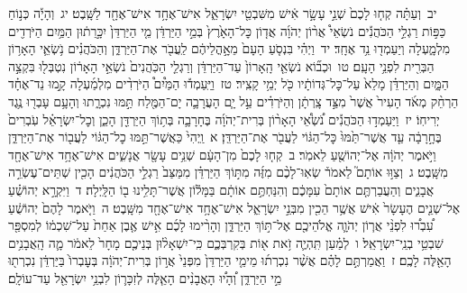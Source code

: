 \documentclass[18pt]{article}
\newcommand{\kri}[1]{\Afootnote{#1}}	%
\begin{document}
 {\loc יב~}וְעַתָּ֗ה קְח֤וּ לָכֶם֙ שְׁנֵ֣י עָשָׂ֣ר אִ֔ישׁ מִשִּׁבְטֵ֖י יִשְׂרָאֵ֑ל אִישׁ־אֶחָ֥ד אִישׁ־אֶחָ֖ד לַשָּֽׁבֶט׃ \startlock
 {\loc יג~}וְהָיָ֡ה כְּנ֣וֹחַ כַּפּ֣וֹת רַגְלֵ֣י הַכֹּהֲנִ֡ים נֹשְׂאֵי֩ אֲר֨וֹן יְהֹוָ֜ה אֲד֤וֹן כׇּל־הָאָ֙רֶץ֙ בְּמֵ֣י הַיַּרְדֵּ֔ן מֵ֤י הַיַּרְדֵּן֙ יִכָּ֣רֵת֔וּן הַמַּ֥יִם הַיֹּרְדִ֖ים מִלְמָ֑עְלָה וְיַעַמְד֖וּ נֵ֥ד אֶחָֽד׃ \startlock
 {\loc יד~}וַיְהִ֗י בִּנְסֹ֤עַ הָעָם֙  מֵאׇ֣הֳלֵיהֶ֔ם  לַֽעֲבֹ֖ר אֶת־הַיַּרְדֵּ֑ן וְהַכֹּהֲנִ֗ים נֹ֥שְׂאֵ֛י הָאָר֥וֹן הַבְּרִ֖ית לִפְנֵ֥י הָעָֽם׃ \startlock
 {\loc טו~}וּכְב֞וֹא נֹשְׂאֵ֤י הָֽאָרוֹן֙ עַד־הַיַּרְדֵּ֔ן וְרַגְלֵ֤י הַכֹּֽהֲנִים֙ נֹשְׂאֵ֣י הָאָר֔וֹן נִטְבְּל֖וּ בִּקְצֵ֣ה הַמָּ֑יִם וְהַיַּרְדֵּ֗ן מָלֵא֙ עַל־כׇּל־גְּדוֹתָ֔יו כֹּ֖ל יְמֵ֥י קָצִֽיר׃ \startlock
 {\loc טז~}וַיַּֽעַמְד֡וּ הַמַּ֩יִם֩ הַיֹּרְדִ֨ים מִלְמַ֜עְלָה קָ֣מוּ נֵד־אֶחָ֗ד הַרְחֵ֨ק מְאֹ֜ד  \edtext{(באדם)}{\kri{קרי: מֵֽאָדָ֤ם}}  הָעִיר֙ אֲשֶׁר֙ מִצַּ֣ד צָֽרְתָ֔ן וְהַיֹּרְדִ֗ים עַ֣ל יָ֧ם הָעֲרָבָ֛ה יָם־הַמֶּ֖לַח תַּ֣מּוּ נִכְרָ֑תוּ וְהָעָ֥ם עָבְר֖וּ נֶ֥גֶד יְרִיחֽוֹ׃ \startlock
 {\loc יז~}וַיַּעַמְד֣וּ הַכֹּהֲנִ֡ים נֹ֠שְׂאֵ֠י הָאָר֨וֹן בְּרִית־יְהֹוָ֜ה בֶּחָרָבָ֛ה בְּת֥וֹךְ הַיַּרְדֵּ֖ן הָכֵ֑ן וְכׇל־יִשְׂרָאֵ֗ל עֹֽבְרִים֙ בֶּחָ֣רָבָ֔ה עַ֤ד אֲשֶׁר־תַּ֙מּוּ֙ כׇּל־הַגּ֔וֹי לַעֲבֹ֖ר אֶת־הַיַּרְדֵּֽן׃ 
\startlock
 {\loc א~}וַֽיְהִי֙ כַּאֲשֶׁר־תַּ֣מּוּ כׇל־הַגּ֔וֹי לַעֲב֖וֹר אֶת־הַיַּרְדֵּ֑ן \edtext{{פ}
}{\kri{פסקא באמצע פסוק}יהושע ד א} וַיֹּ֣אמֶר יְהֹוָ֔ה אֶל־יְהוֹשֻׁ֖עַ לֵאמֹֽר׃ \startlock
 {\loc ב~}קְח֤וּ לָכֶם֙ מִן־הָעָ֔ם שְׁנֵ֥ים עָשָׂ֖ר אֲנָשִׁ֑ים אִישׁ־אֶחָ֥ד אִישׁ־אֶחָ֖ד מִשָּֽׁבֶט׃ \startlock
 {\loc ג~}וְצַוּ֣וּ אוֹתָם֮ לֵאמֹר֒ שְׂאֽוּ־לָכֶ֨ם מִזֶּ֜ה מִתּ֣וֹךְ הַיַּרְדֵּ֗ן מִמַּצַּב֙ רַגְלֵ֣י הַכֹּהֲנִ֔ים הָכִ֖ין שְׁתֵּים־עֶשְׂרֵ֣ה אֲבָנִ֑ים וְהַעֲבַרְתֶּ֤ם אוֹתָם֙ עִמָּכֶ֔ם וְהִנַּחְתֶּ֣ם אוֹתָ֔ם בַּמָּל֕וֹן אֲשֶׁר־תָּלִ֥ינוּ ב֖וֹ הַלָּֽיְלָה׃ \startlock
 {\loc ד~}וַיִּקְרָ֣א יְהוֹשֻׁ֗עַ אֶל־שְׁנֵ֤ים הֶעָשָׂר֙ אִ֔ישׁ אֲשֶׁ֥ר הֵכִ֖ין מִבְּנֵ֣י יִשְׂרָאֵ֑ל אִישׁ־אֶחָ֥ד אִישׁ־אֶחָ֖ד מִשָּֽׁבֶט׃ \startlock
 {\loc ה~}וַיֹּ֤אמֶר לָהֶם֙ יְהוֹשֻׁ֔עַ עִ֠בְר֠וּ לִפְנֵ֨י אֲר֧וֹן יְהֹוָ֛ה אֱלֹהֵיכֶ֖ם אֶל־תּ֣וֹךְ הַיַּרְדֵּ֑ן וְהָרִ֨ימוּ לָכֶ֜ם אִ֣ישׁ אֶ֤בֶן אַחַת֙ עַל־שִׁכְמ֔וֹ לְמִסְפַּ֖ר שִׁבְטֵ֥י בְנֵֽי־יִשְׂרָאֵֽל׃ \startlock
 {\loc ו~}לְמַ֗עַן תִּֽהְיֶ֛ה זֹ֥את א֖וֹת בְּקִרְבְּכֶ֑ם כִּֽי־יִשְׁאָל֨וּן בְּנֵיכֶ֤ם מָחָר֙ לֵאמֹ֔ר מָ֛ה הָֽאֲבָנִ֥ים הָאֵ֖לֶּה לָכֶֽם׃ \startlock
 {\loc ז~}וַאֲמַרְתֶּ֣ם לָהֶ֗ם אֲשֶׁ֨ר נִכְרְת֜וּ מֵימֵ֤י הַיַּרְדֵּן֙ מִפְּנֵי֙ אֲר֣וֹן בְּרִית־יְהֹוָ֔ה בְּעׇבְרוֹ֙ בַּיַּרְדֵּ֔ן נִכְרְת֖וּ מֵ֣י הַיַּרְדֵּ֑ן וְ֠הָי֠וּ הָאֲבָנִ֨ים הָאֵ֧לֶּה לְזִכָּר֛וֹן לִבְנֵ֥י יִשְׂרָאֵ֖ל עַד־עוֹלָֽם׃ \startlock
\end{document}
